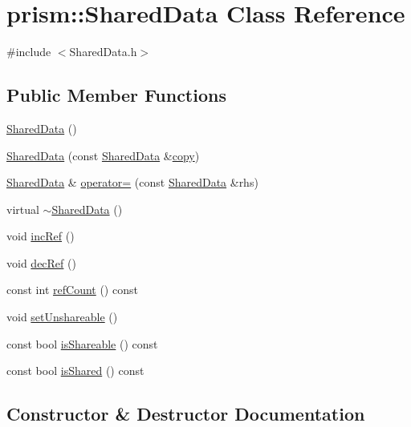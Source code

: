 \hypertarget{classprism_1_1_shared_data}{}\section{prism\+:\+:Shared\+Data Class Reference}
\label{classprism_1_1_shared_data}


{\ttfamily \#include $<$Shared\+Data.\+h$>$}

\subsection*{Public Member Functions}
\begin{DoxyCompactItemize}
\item 
\hyperlink{classprism_1_1_shared_data_a68d7aab69703ca6152731f1e041d6949}{Shared\+Data} ()
\item 
\hyperlink{classprism_1_1_shared_data_a90f3a23c943c077a2d23776ba0b207c1}{Shared\+Data} (const \hyperlink{classprism_1_1_shared_data}{Shared\+Data} \&\hyperlink{namespaceprism_ae776f4cd825f79e7af1cf6ee1d90a209}{copy})
\item 
\hyperlink{classprism_1_1_shared_data}{Shared\+Data} \& \hyperlink{classprism_1_1_shared_data_ab01467181ab0a5bd75afce8248c4bb65}{operator=} (const \hyperlink{classprism_1_1_shared_data}{Shared\+Data} \&rhs)
\item 
virtual \hyperlink{classprism_1_1_shared_data_ae726b22aee87a1551b46188482c92bc3}{$\sim$\+Shared\+Data} ()
\item 
void \hyperlink{classprism_1_1_shared_data_ae389431d573a0131b368c60531006fd2}{inc\+Ref} ()
\item 
void \hyperlink{classprism_1_1_shared_data_a270cf0cca02293714175d70acd92f049}{dec\+Ref} ()
\item 
const int \hyperlink{classprism_1_1_shared_data_a4886256c18ff603dece3cad4fb4f579b}{ref\+Count} () const 
\item 
void \hyperlink{classprism_1_1_shared_data_a09445f57e7dea60a37477a36d74365ac}{set\+Unshareable} ()
\item 
const bool \hyperlink{classprism_1_1_shared_data_a2c995e732a31d8f9a29c2fd46e0256ff}{is\+Shareable} () const 
\item 
const bool \hyperlink{classprism_1_1_shared_data_a2b919077f094e7d8970721b77677b584}{is\+Shared} () const 
\end{DoxyCompactItemize}


\subsection{Constructor \& Destructor Documentation}
